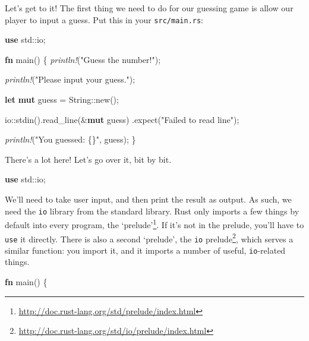 \documentclass[a4paper,]{book}
\newenvironment{Shaded}{\begin{snugshade}}{\end{snugshade}}
\newcommand{\KeywordTok}[1]{\textcolor[rgb]{0.13,0.29,0.53}{\textbf{{#1}}}}
\newcommand{\DataTypeTok}[1]{\textcolor[rgb]{0.13,0.29,0.53}{{#1}}}
\newcommand{\StringTok}[1]{\textcolor[rgb]{0.31,0.60,0.02}{{#1}}}
\newcommand{\PreprocessorTok}[1]{\textcolor[rgb]{0.56,0.35,0.01}{\textit{{#1}}}}
\newcommand{\NormalTok}[1]{{#1}}
\renewcommand{\href}[2]{#2\footnote{\url{#1}}}
\begin{document}
Let's get to it! The first thing we need to do for our guessing game is
allow our player to input a guess. Put this in your
\texttt{src/main.rs}:

\begin{Shaded}
\begin{Highlighting}[]
\KeywordTok{use} \NormalTok{std::io;}

\KeywordTok{fn} \NormalTok{main() \{}
    \PreprocessorTok{println!}\NormalTok{(}\StringTok{"Guess the number!"}\NormalTok{);}

    \PreprocessorTok{println!}\NormalTok{(}\StringTok{"Please input your guess."}\NormalTok{);}

    \KeywordTok{let} \KeywordTok{mut} \NormalTok{guess = }\DataTypeTok{String}\NormalTok{::new();}

    \NormalTok{io::stdin().read_line(&}\KeywordTok{mut} \NormalTok{guess)}
        \NormalTok{.expect(}\StringTok{"Failed to read line"}\NormalTok{);}

    \PreprocessorTok{println!}\NormalTok{(}\StringTok{"You guessed: \{\}"}\NormalTok{, guess);}
\NormalTok{\}}
\end{Highlighting}
\end{Shaded}

There's a lot here! Let's go over it, bit by bit.

\begin{Shaded}
\begin{Highlighting}[]
\KeywordTok{use} \NormalTok{std::io;}
\end{Highlighting}
\end{Shaded}

We'll need to take user input, and then print the result as output. As
such, we need the \texttt{io} library from the standard library. Rust
only imports a few things by default into every program,
\href{http://doc.rust-lang.org/std/prelude/index.html}{the `prelude'}.
If it's not in the prelude, you'll have to \texttt{use} it directly.
There is also a second `prelude', the
\href{http://doc.rust-lang.org/std/io/prelude/index.html}{\texttt{io}
prelude}, which serves a similar function: you import it, and it imports
a number of useful, \texttt{io}-related things.

\begin{Shaded}
\begin{Highlighting}[]
\KeywordTok{fn} \NormalTok{main() \{}
\end{Highlighting}
\end{Shaded}
\end{document}
